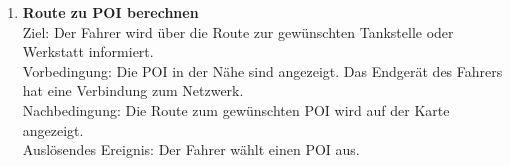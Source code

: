 \documentclass[pflichtenheft.tex]{subfiles}
\begin{document}
\begin{enumerate}
  	\item {\textbf{Route zu POI berechnen}}
  		\\Ziel: Der Fahrer wird über die Route zur gewünschten Tankstelle oder Werkstatt informiert. 
  		\\Vorbedingung: Die POI in der Nähe sind angezeigt. Das Endgerät des Fahrers hat eine Verbindung zum Netzwerk.
  		\\Nachbedingung: Die Route zum gewünschten POI wird auf der Karte angezeigt.
   		\\Auslösendes Ereignis: Der Fahrer wählt einen POI aus.

   		\renewcommand{\theenumi}{/FA\ifnum \value{enumi}<10 0\fi\arabic{enumi}0/}
		\renewcommand{\labelenumi}{\theenumi}
		\renewcommand{\theenumii}{\arabic{enumii}}
		\renewcommand{\labelenumii}{/FA\ifnum \value{enumi}<10 0\fi\arabic{enumi}\arabic{enumii}/}
  


	\setcounter{enumTemp}{\value{enumi}}
	\end{enumerate}
\end{document}
